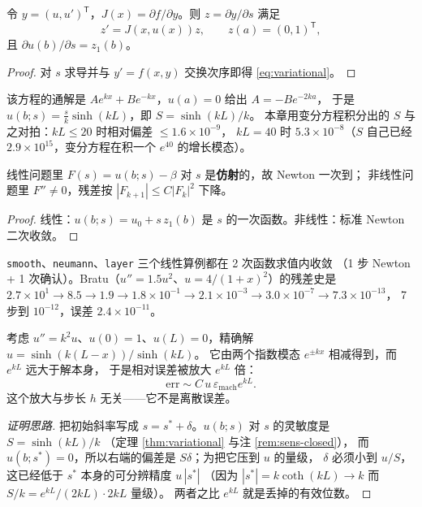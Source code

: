 \begin{theorem}
\label{thm:variational}
令 $y=(u,u')^{\mathsf T}$，$J(x)=\partial f/\partial y$。则 $z=\partial y/\partial s$ 满足
\begin{equation}
  z'=J(x,u(x))z,\qquad z(a)=(0,1)^{\mathsf T},
  \label{eq:variational}
\end{equation}
且 $\partial u(b)/\partial s=z_1(b)$。
\end{theorem}
\begin{proof}
对 $s$ 求导并与 $y'=f(x,y)$ 交换次序即得 \eqref{eq:variational}。
\end{proof}

\begin{remark}[实测：$u''=k^2u$、$u(a)=0$ 的闭式就是 $\sinh(kL)/k$]
\label{rem:sens-closed}
该方程的通解是 $Ae^{kx}+Be^{-kx}$，$u(a)=0$ 给出 $A=-Be^{-2ka}$，
于是 $u(b;s)=\frac{s}{k}\sinh(kL)$，即 $S=\sinh(kL)/k$。
本章用变分方程积分出的 $S$ 与之对拍：$kL\le20$ 时相对偏差 $\le1.6\times10^{-9}$，
$kL=40$ 时 $5.3\times10^{-8}$（$S$ 自己已经 $2.9\times10^{15}$，变分方程在积一个 $e^{40}$ 的增长模态）。
\end{remark}

\begin{theorem}
线性问题里 $F(s)=u(b;s)-\beta$ 对 $s$ 是\textbf{仿射}的，故 Newton 一次到；
非线性问题里 $F''\ne0$，残差按 $|F_{k+1}|\le C|F_k|^2$ 下降。
\end{theorem}
\begin{proof}
线性：$u(b;s)=u_0+s\,z_1(b)$ 是 $s$ 的一次函数。非线性：标准 Newton 二次收敛。
\end{proof}

\begin{remark}
\texttt{smooth}、\texttt{neumann}、\texttt{layer} 三个线性算例都在 2 次函数求值内收敛
（1 步 Newton + 1 次确认）。Bratu（$u''=1.5u^2$、$u=4/(1+x)^2$）的残差史是
$2.7\times10^{1}\to8.5\to1.9\to1.8\times10^{-1}\to2.1\times10^{-3}\to3.0\times10^{-7}\to7.3\times10^{-13}$，
7 步到 $10^{-12}$，误差 $2.4\times10^{-11}$。
\end{remark}

\begin{theorem}
\label{thm:decay-fail}
考虑 $u''=k^2u$、$u(0)=1$、$u(L)=0$，精确解 $u=\sinh(k(L-x))/\sinh(kL)$。
它由两个指数模态 $e^{\pm kx}$ 相减得到，而 $e^{kL}$ 远大于解本身，
于是相对误差被放大 $e^{kL}$ 倍：
\begin{equation}
  \text{err}\sim C\,u\,\varepsilon_{\text{mach}}e^{kL}.
  \label{eq:decay-err}
\end{equation}
这个放大与步长 $h$ 无关——它不是离散误差。
\end{theorem}
\begin{proof}[证明思路]
把初始斜率写成 $s=s^*+\delta$。$u(b;s)$ 对 $s$ 的灵敏度是 $S=\sinh(kL)/k$
（定理 \ref{thm:variational} 与注 \ref{rem:sens-closed}），
而 $u(b;s^*)=0$，所以右端的偏差是 $S\delta$；为把它压到 $u$ 的量级，
$\delta$ 必须小到 $u/S$，这已经低于 $s^*$ 本身的可分辨精度 $u\,|s^*|$
（因为 $|s^*|=k\coth(kL)\to k$ 而 $S/k=e^{kL}/(2kL)\cdot2kL$ 量级）。
两者之比 $e^{kL}$ 就是丢掉的有效位数。
\end{proof}

